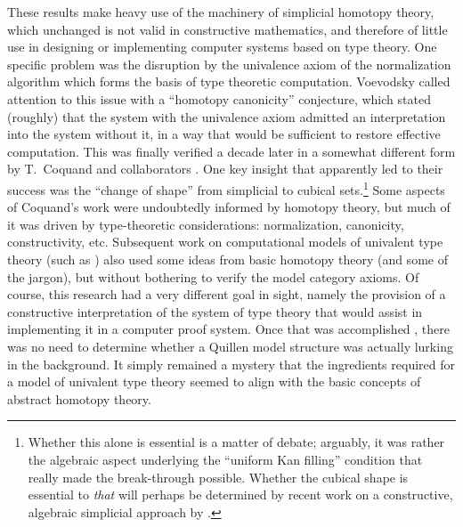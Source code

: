 \documentclass[11pt]{amsart}
\theoremstyle{remark}
\theoremstyle{definition}
\begin{document}
These results make heavy use of the machinery of simplicial homotopy theory, which unchanged is not valid in constructive mathematics, and therefore of little use in designing or implementing computer systems based on type theory.  One specific problem was the disruption by the univalence axiom of the normalization algorithm which forms the basis of type theoretic computation. Voevodsky called attention to this issue with a ``homotopy canonicity'' conjecture, which stated (roughly) that the system with the univalence axiom admitted an interpretation into the system without it, in a way that would be sufficient to restore effective computation.  This was finally verified a decade later in a somewhat different form by T.~Coquand and collaborators \cite{BCH,CCHM}.  One key insight that apparently led to their success was the ``change of shape'' from simplicial to cubical sets.\footnote{Whether this alone is essential is a matter of debate; arguably, it was rather the algebraic aspect underlying the ``uniform Kan filling'' condition that really made the break-through possible.  Whether the cubical shape is essential to \emph{that} will perhaps be determined by recent work on a constructive, algebraic simplicial approach by \cite{Henry-Gambino}.}  
Some aspects of Coquand's work were undoubtedly informed by homotopy theory, but much of it was driven by type-theoretic considerations: normalization, canonicity, constructivity, etc.   
Subsequent work on computational models of univalent type theory (such as \cite{OP,Harper}) also used some ideas from basic homotopy theory (and some of the jargon), but without bothering to verify the model category axioms.  Of course, this research had a very different goal in sight, namely the provision of a constructive interpretation of the system of type theory that would assist in implementing it in a computer proof system.  Once that was accomplished \cite{cubical,redTT}, there was no need to determine whether a Quillen model structure was actually lurking in the background.  It simply remained a mystery that the ingredients required for a model of univalent type theory seemed to align with the basic concepts of abstract homotopy theory.  
\end{document}
